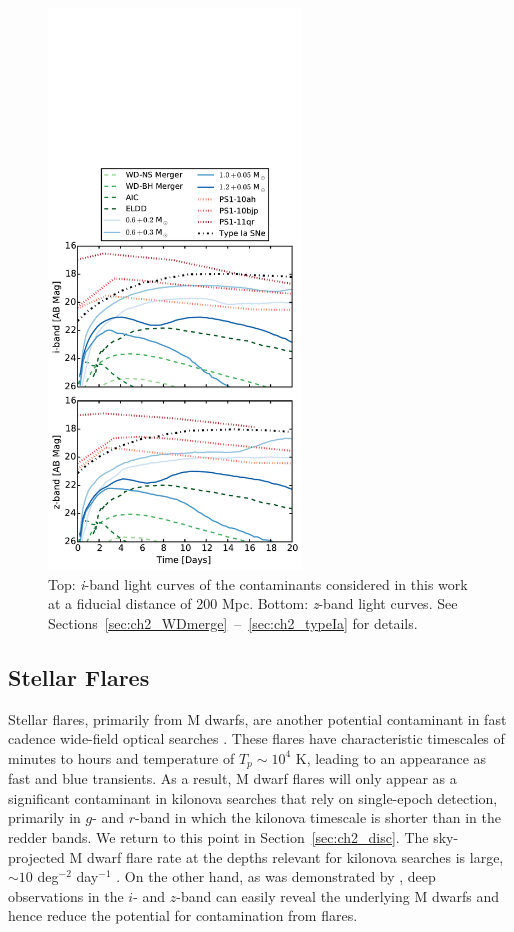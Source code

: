 \begin{figure}[h!]
\centering
\includegraphics[trim= 0 0 0 240 ,clip,width=0.6\textwidth]{./figs/chapter2/ch2_f2.pdf}
\caption{Top: {\em i}-band light curves of the contaminants considered in this work at a fiducial distance of 200 Mpc. Bottom: {\em z}-band light curves. See Sections~\ref{sec:ch2_WDmerge}~--~\ref{sec:ch2_typeIa} for details.}
\label{fig:ch2_LCcont}
\end{figure}

\subsection{Stellar Flares}
\label{sec:ch2_flarestar}
Stellar flares, primarily from M dwarfs, are another potential contaminant in fast cadence wide-field optical searches \citep{Becker+04,KulkarniRau06,Berger+13}.  These flares have characteristic timescales of minutes to hours \citep[see e.g.,][]{Berger+13} and temperature of $T_p \sim 10^4$ K, leading to an appearance as fast and blue transients.  As a result, M dwarf flares will only appear as a significant contaminant in kilonova searches that rely on single-epoch detection, primarily in $g$- and $r$-band in which the kilonova timescale is shorter than in the redder bands.  We return to this point in Section~\ref{sec:ch2_disc}.  The sky-projected M dwarf flare rate at the depths relevant for kilonova searches is large, $\sim 10$ deg$^{-2}$ day$^{-1}$ \citep{KulkarniRau06}.  On the other hand, as was demonstrated by \citet{Berger+13}, deep observations in the $i$- and $z$-band can easily reveal the underlying M dwarfs and hence reduce the potential for contamination from flares.


